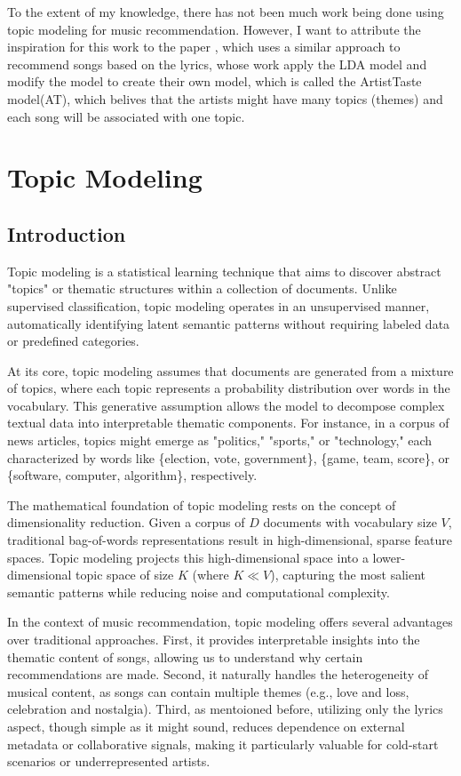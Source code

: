 \documentclass[12pt]{article}
\begin{document}
To the extent of my knowledge, there has not been much work being done using
topic modeling for music recommendation. However, I want to attribute the
inspiration for this work to the paper \cite{tsukuda2017lyricjumper}, which
uses a similar approach to recommend songs based on the lyrics, whose work
apply the LDA model and modify the model to create their own model, which is
called the ArtistTaste model(AT), which belives that the artists might have
many topics (themes) and each song will be associated with one topic.

\section{Topic Modeling}
\subsection{Introduction}
Topic modeling is a statistical learning technique that aims to discover
abstract "topics" or thematic structures within a collection of documents.
Unlike supervised classification, topic modeling operates in an unsupervised
manner, automatically identifying latent semantic patterns without requiring
labeled data or predefined categories.

At its core, topic modeling assumes that documents are generated from a mixture
of topics, where each topic represents a probability distribution over words in
the vocabulary. This generative assumption allows the model to decompose
complex textual data into interpretable thematic components. For instance, in a
corpus of news articles, topics might emerge as "politics," "sports," or
"technology," each characterized by words like \{election, vote, government\},
\{game, team, score\}, or \{software, computer, algorithm\}, respectively.

The mathematical foundation of topic modeling rests on the concept of
dimensionality reduction. Given a corpus of $D$ documents with vocabulary size
$V$, traditional bag-of-words representations result in high-dimensional,
sparse feature spaces. Topic modeling projects this high-dimensional space into
a lower-dimensional topic space of size $K$ (where $K \ll V$), capturing the
most salient semantic patterns while reducing noise and computational
complexity.

In the context of music recommendation, topic modeling offers several
advantages over traditional approaches. First, it provides interpretable
insights into the thematic content of songs, allowing us to understand why
certain recommendations are made. Second, it naturally handles the
heterogeneity of musical content, as songs can contain multiple themes (e.g.,
love and loss, celebration and nostalgia). Third, as mentoioned before,
utilizing only the lyrics aspect, though simple as it might sound, reduces
dependence on external metadata or collaborative signals, making it
particularly valuable for cold-start scenarios or underrepresented artists.
\end{document}
